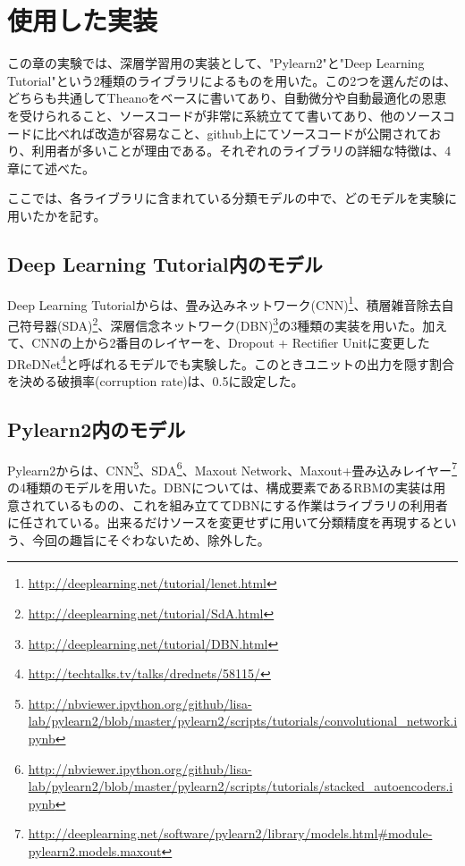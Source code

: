 \section{使用した実装}
この章の実験では、深層学習用の実装として、"Pylearn2"と"Deep Learning Tutorial"という2種類のライブラリによるものを用いた。この2つを選んだのは、どちらも共通してTheanoをベースに書いてあり、自動微分や自動最適化の恩恵を受けられること、ソースコードが非常に系統立てて書いてあり、他のソースコードに比べれば改造が容易なこと、github上にてソースコードが公開されており、利用者が多いことが理由である。それぞれのライブラリの詳細な特徴は、4章にて述べた。\par
ここでは、各ライブラリに含まれている分類モデルの中で、どのモデルを実験に用いたかを記す。

\subsection{Deep Learning Tutorial内のモデル}
Deep Learning Tutorialからは、畳み込みネットワーク(CNN)\footnote{\url{http://deeplearning.net/tutorial/lenet.html}}、積層雑音除去自己符号器(SDA)\footnote{\url{http://deeplearning.net/tutorial/SdA.html}}、深層信念ネットワーク(DBN)\footnote{\url{http://deeplearning.net/tutorial/DBN.html}}の3種類の実装を用いた。加えて、CNNの上から2番目のレイヤーを、Dropout + Rectifier Unitに変更したDReDNet\footnote{\url{http://techtalks.tv/talks/drednets/58115/}}と呼ばれるモデルでも実験した。このときユニットの出力を隠す割合を決める破損率(corruption rate)は、0.5に設定した。

\subsection{Pylearn2内のモデル}
Pylearn2からは、CNN\footnote{\url{http://nbviewer.ipython.org/github/lisa-lab/pylearn2/blob/master/pylearn2/scripts/tutorials/convolutional_network.ipynb}}、SDA\footnote{\url{http://nbviewer.ipython.org/github/lisa-lab/pylearn2/blob/master/pylearn2/scripts/tutorials/stacked_autoencoders.ipynb}}、Maxout Network、Maxout+畳み込みレイヤー\footnote{\url{http://deeplearning.net/software/pylearn2/library/models.html#module-pylearn2.models.maxout}}の4種類のモデルを用いた。DBNについては、構成要素であるRBMの実装は用意されているものの、これを組み立ててDBNにする作業はライブラリの利用者に任されている。出来るだけソースを変更せずに用いて分類精度を再現するという、今回の趣旨にそぐわないため、除外した。

